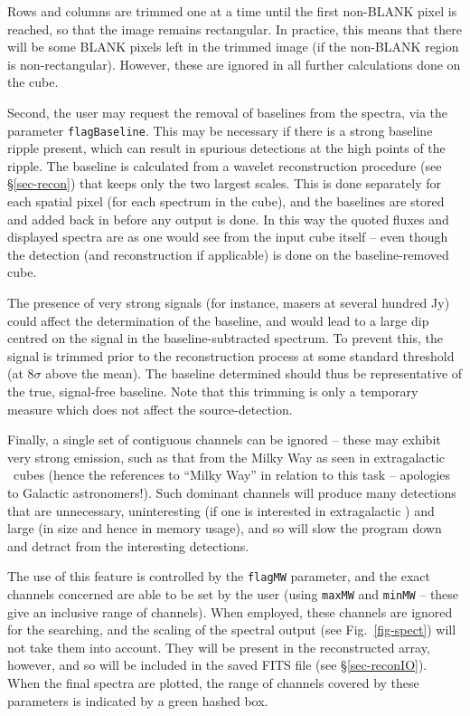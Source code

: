 Rows and columns are trimmed one at a time until the first non-BLANK
pixel is reached, so that the image remains rectangular. In practice,
this means that there will be some BLANK pixels left in the trimmed
image (if the non-BLANK region is non-rectangular). However, these are
ignored in all further calculations done on the cube.


Second, the user may request the removal of baselines from the
spectra, via the parameter \texttt{flagBaseline}. This may be
necessary if there is a strong baseline ripple present, which can
result in spurious detections at the high points of the ripple. The
baseline is calculated from a wavelet reconstruction procedure (see
\S\ref{sec-recon}) that keeps only the two largest scales. This is
done separately for each spatial pixel (\ie for each spectrum in the
cube), and the baselines are stored and added back in before any
output is done. In this way the quoted fluxes and displayed spectra
are as one would see from the input cube itself -- even though the
detection (and reconstruction if applicable) is done on the
baseline-removed cube.

The presence of very strong signals (for instance, masers at several
hundred Jy) could affect the determination of the baseline, and would
lead to a large dip centred on the signal in the baseline-subtracted
spectrum. To prevent this, the signal is trimmed prior to the
reconstruction process at some standard threshold (at $8\sigma$ above
the mean). The baseline determined should thus be representative of
the true, signal-free baseline. Note that this trimming is only a
temporary measure which does not affect the source-detection.


Finally, a single set of contiguous channels can be ignored -- these
may exhibit very strong emission, such as that from the Milky Way as
seen in extragalactic \hi\ cubes (hence the references to ``Milky
Way'' in relation to this task -- apologies to Galactic
astronomers!). Such dominant channels will produce many detections
that are unnecessary, uninteresting (if one is interested in
extragalactic \hi) and large (in size and hence in memory usage), and
so will slow the program down and detract from the interesting
detections. 

The use of this feature is controlled by the \texttt{flagMW}
parameter, and the exact channels concerned are able to be set by the
user (using \texttt{maxMW} and \texttt{minMW} -- these give an
inclusive range of channels). When employed, these channels are
ignored for the searching, and the scaling of the spectral output (see
Fig.~\ref{fig-spect}) will not take them into account. They will be
present in the reconstructed array, however, and so will be included
in the saved FITS file (see \S\ref{sec-reconIO}). When the final
spectra are plotted, the range of channels covered by these parameters
is indicated by a green hashed box.

